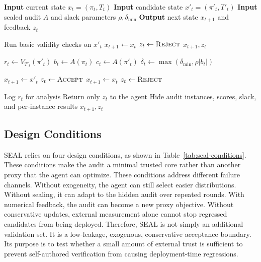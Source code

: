 \documentclass[letterpaper]{article} \usepackage{aaai2027}  \usepackage[hyphens]{url}  \usepackage{graphicx} \urlstyle{rm} \def\UrlFont{\rm}  \usepackage{natbib}  \usepackage{caption} \usepackage{amsfonts} \usepackage{multirow} \frenchspacing  \usepackage{algorithm}
\newcommand{\method}{SEAL}
\begin{document}
\begin{algorithm}[t]
\small
\caption{One round of \method{}}
\label{alg:seal_round}
\begin{algorithmic}[1]
\State \textbf{Input} current state $x_t=(\pi_t,T_t)$
\State \textbf{Input} candidate state $x'_t=(\pi'_t,T'_t)$
\State \textbf{Input} sealed audit $A$ and slack parameters $\rho,\delta_{\min}$
\State \textbf{Output} next state $x_{t+1}$ and feedback $z_t$

\State Run basic validity checks on $x'_t$
    \State $x_{t+1} \gets x_t$
    \State $z_t \gets \textsc{Reject}$
    \State \Return $x_{t+1}, z_t$
\EndIf

\State $r_t \gets V_{T'_t}(\pi'_t)$
\State $b_t \gets A(\pi_t)$
\State $c_t \gets A(\pi'_t)$
\State $\delta_t \gets \max(\delta_{\min}, \rho |b_t|)$

    \State $x_{t+1} \gets x'_t$
    \State $z_t \gets \textsc{Accept}$
\Else
    \State $x_{t+1} \gets x_t$
    \State $z_t \gets \textsc{Reject}$
\EndIf

\State Log $r_t$ for analysis
\State Return only $z_t$ to the agent
\State Hide audit instances, scores, slack, and per-instance results
\State \Return $x_{t+1}, z_t$
\end{algorithmic}
\end{algorithm}








\subsection{Design Conditions}




SEAL relies on four design conditions, as shown in Table~\ref{tab:seal-conditions}. These conditions make the audit a minimal trusted core rather than another proxy that the agent can optimize. These conditions address different failure channels. 
Without exogeneity, the agent can still select easier distributions. Without sealing, it can adapt to the hidden audit over repeated rounds. With numerical feedback, the audit can become a new proxy objective. Without conservative updates, external measurement alone cannot stop regressed candidates from being deployed.
Therefore, \method{} is not simply an additional validation set. It is a low-leakage, exogenous, conservative acceptance boundary. Its purpose is to test whether a small amount of external trust is sufficient to prevent self-authored verification from causing deployment-time regressions.
\end{document}
